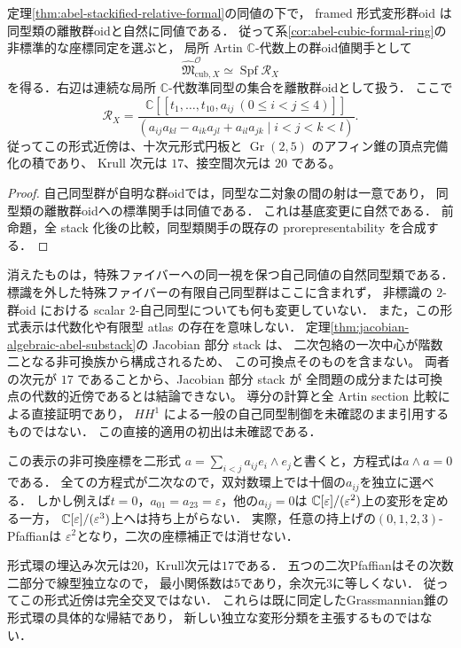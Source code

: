 \begin{corollary}
\label{cor:abel-full-stack-discrete-formal}
定理\ref{thm:abel-stackified-relative-formal}の同値の下で，
framed 形式変形群oid は同型類の離散群oidと自然に同値である．
従って系\ref{cor:abel-cubic-formal-ring}の非標準的な座標同定を選ぶと，
局所 Artin $\mathbb C$-代数上の群oid値関手として
\[
 \widehat{\mathfrak M}^{\mathcal O}_{\mathrm{cub},X}
 \simeq \operatorname{Spf}\mathcal R_X
\]
を得る．右辺は連続な局所 $\mathbb C$-代数準同型の集合を離散群oidとして扱う．
ここで
\[
 \mathcal R_X=
 \frac{\mathbb C[[t_1,\ldots,t_{10},a_{ij}\ (0\le i<j\le4)]]}
 {(a_{ij}a_{kl}-a_{ik}a_{jl}+a_{il}a_{jk}\mid i<j<k<l)}.
\]
従ってこの形式近傍は、十次元形式円板と
$\operatorname{Gr}(2,5)$ のアフィン錐の頂点完備化の積であり、
Krull 次元は $17$、接空間次元は $20$ である。
\end{corollary}
\begin{proof}
自己同型群が自明な群oidでは，同型な二対象の間の射は一意であり，
同型類の離散群oidへの標準関手は同値である．
これは基底変更に自然である．
前命題，全 stack 化後の比較，同型類関手の既存の prorepresentability を合成する．
\end{proof}

\begin{remark}[規約と範囲]
消えたものは，特殊ファイバーへの同一視を保つ自己同値の自然同型類である．
標識を外した特殊ファイバーの有限自己同型群はここに含まれず，
非標識の $2$-群oid における scalar $2$-自己同型についても何も変更していない．
また，この形式表示は代数化や有限型 atlas の存在を意味しない．
定理\ref{thm:jacobian-algebraic-abel-substack}の Jacobian 部分 stack は、
二次包絡の一次中心が階数二となる非可換族から構成されるため、
この可換点そのものを含まない。
両者の次元が $17$ であることから、Jacobian 部分 stack が
全問題の成分または可換点の代数的近傍であるとは結論できない。
導分の計算と全 Artin section 比較による直接証明であり，
$HH^1$ による一般の自己同型制御を未確認のまま引用するものではない．
この直接的適用の初出は未確認である．
\end{remark}

\begin{remark}[一次方向の障害と完全交叉性]
\label{rem:abel-formal-quadratic-obstruction}
この表示の非可換座標を二形式
$a=\sum_{i<j}a_{ij}e_i\wedge e_j$と書くと，方程式は$a\wedge a=0$である．
全ての方程式が二次なので，双対数環上では十個の$a_{ij}$を独立に選べる．
しかし例えば$t=0$，$a_{01}=a_{23}=\varepsilon$，他の$a_{ij}=0$は
$\mathbb C[\varepsilon]/(\varepsilon^2)$上の変形を定める一方，
$\mathbb C[\varepsilon]/(\varepsilon^3)$上へは持ち上がらない．
実際，任意の持上げの$(0,1,2,3)$-Pfaffianは
$\varepsilon^2$となり，二次の座標補正では消せない．

形式環の埋込み次元は$20$，Krull次元は$17$である．
五つの二次Pfaffianはその次数二部分で線型独立なので，
最小関係数は$5$であり，余次元$3$に等しくない．
従ってこの形式近傍は完全交叉ではない．
これらは既に同定したGrassmannian錐の形式環の具体的な帰結であり，
新しい独立な変形分類を主張するものではない．
\end{remark}
